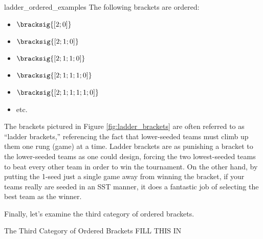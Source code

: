 {\begin{corollary}{}{ladder_ordered_examples}
    The following brackets are ordered:
    \begin{itemize}
        \item $\bracksig{[2; 0]}$
        \item $\bracksig{[2; 1; 0]}$
        \item $\bracksig{[2; 1; 1; 0]}$
        \item $\bracksig{[2; 1; 1; 1; 0]}$
        \item $\bracksig{[2; 1; 1; 1; 1; 0]}$
        \item etc.
    \end{itemize}
\end{corollary}


The brackets pictured in Figure \ref{fig:ladder_brackets} are often referred to as ``ladder brackets,'' referencing the fact that lower-seeded teams must climb up them one rung (game) at a time. Ladder brackets are as punishing a bracket to the lower-seeded teams as one could design, forcing the two lowest-seeded teams to beat every other team in order to win the tournament. On the other hand, by putting the 1-seed just a single game away from winning the bracket, if your teams really are seeded in an SST manner, it does a fantastic job of selecting the best team as the winner.

Finally, let's examine the third category of ordered brackets.

\begin{definition}{The Third Category of Ordered Brackets}{}
    FILL THIS IN
\end{definition}




}